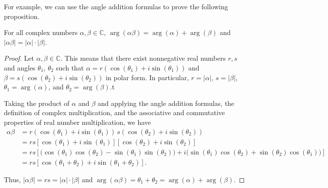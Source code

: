 \documentclass{article}
\begin{document}
For example, we can use the angle addition formulas to prove the following proposition.

\begin{prop*} For all complex numbers $\alpha, \beta \in \mathbb{C}$, $\arg(\alpha \beta) = \arg(\alpha) + \arg(\beta)$ and $|\alpha\beta| = |\alpha| \cdot |\beta|$.
\end{prop*}

\begin{proof}
Let $\alpha, \beta \in \mathbb{C}$.
This means that there exist nonnegative real numbers $r,s$ and angles $\theta_1$, $\theta_2$ such that $\alpha = r (\cos(\theta_1) + i \sin(\theta_1))$ and $\beta = s(\cos(\theta_2) + i \sin(\theta_2))$ in polar form.  In particular, $r = |\alpha|$, $s = |\beta|$, $\theta_1 = \arg(\alpha)$, and $\theta_2 = \arg(\beta)$.t

Taking the product of $\alpha$ and $\beta$ and applying the angle addition formulas, the definition of complex multiplication, and the associative and commutative properties of real number multiplication, we have
\begin{align*}
    \alpha \beta &= r (\cos(\theta_1) + i \sin(\theta_1))\, s(\cos(\theta_2) + i \sin(\theta_2)) \\
                 &= rs \left[\cos(\theta_1) + i \sin(\theta_1)\right] \left[\cos(\theta_2) + i \sin(\theta_2)\right] \\
                 &= rs \left[\big(\cos(\theta_1)\cos(\theta_2) - \sin(\theta_1)\sin(\theta_2)\big) + i \big(\sin(\theta_1)\cos(\theta_2) + \sin(\theta_2)\cos(\theta_1)\big)\right]\\
                 &= rs \left[\cos(\theta_1 + \theta_2) + i \sin(\theta_1 + \theta_2)\right].
\end{align*}

Thus, $|\alpha \beta| = rs = |\alpha|\cdot|\beta|$ and $\arg(\alpha \beta) = \theta_1 + \theta_2 = \arg(\alpha) + \arg(\beta)$.
\end{proof}
\end{document}
